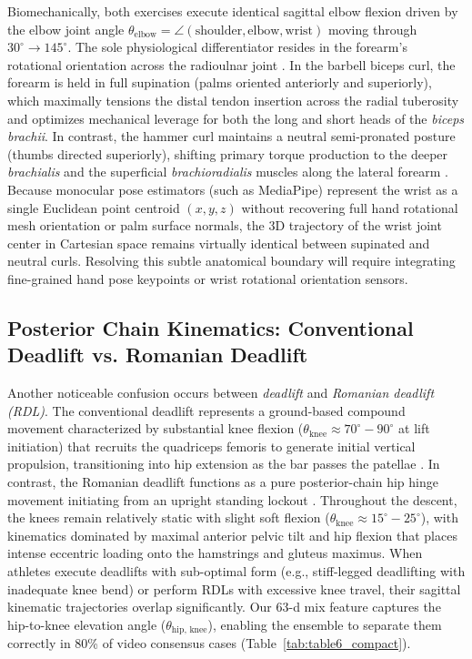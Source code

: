 \documentclass[runningheads]{llncs}
\begin{document}
Biomechanically, both exercises execute identical sagittal elbow flexion driven by the elbow joint angle $\theta_{\text{elbow}} = \angle(\text{shoulder}, \text{elbow}, \text{wrist})$ moving through $30^\circ \to 145^\circ$. The sole physiological differentiator resides in the forearm's rotational orientation across the radioulnar joint \cite{oliveira2009,marcolin2018}. In the barbell biceps curl, the forearm is held in full supination (palms oriented anteriorly and superiorly), which maximally tensions the distal tendon insertion across the radial tuberosity and optimizes mechanical leverage for both the long and short heads of the \textit{biceps brachii}. In contrast, the hammer curl maintains a neutral semi-pronated posture (thumbs directed superiorly), shifting primary torque production to the deeper \textit{brachialis} and the superficial \textit{brachioradialis} muscles along the lateral forearm \cite{oliveira2009,marcolin2018}. Because monocular pose estimators (such as MediaPipe) represent the wrist as a single Euclidean point centroid $(x, y, z)$ without recovering full hand rotational mesh orientation or palm surface normals, the 3D trajectory of the wrist joint center in Cartesian space remains virtually identical between supinated and neutral curls. Resolving this subtle anatomical boundary will require integrating fine-grained hand pose keypoints or wrist rotational orientation sensors.

\subsection{Posterior Chain Kinematics: Conventional Deadlift vs. Romanian Deadlift}
Another noticeable confusion occurs between \textit{deadlift} and \textit{Romanian deadlift (RDL)}. The conventional deadlift represents a ground-based compound movement characterized by substantial knee flexion ($\theta_{\text{knee}} \approx 70^\circ-90^\circ$ at lift initiation) that recruits the quadriceps femoris to generate initial vertical propulsion, transitioning into hip extension as the bar passes the patellae \cite{escamilla2000}. In contrast, the Romanian deadlift functions as a pure posterior-chain hip hinge movement initiating from an upright standing lockout \cite{mcallister2014,schoenfeld2010}. Throughout the descent, the knees remain relatively static with slight soft flexion ($\theta_{\text{knee}} \approx 15^\circ-25^\circ$), with kinematics dominated by maximal anterior pelvic tilt and hip flexion that places intense eccentric loading onto the hamstrings and gluteus maximus. When athletes execute deadlifts with sub-optimal form (e.g., stiff-legged deadlifting with inadequate knee bend) or perform RDLs with excessive knee travel, their sagittal kinematic trajectories overlap significantly. Our 63-d mix feature captures the hip-to-knee elevation angle ($\theta_{\text{hip, knee}}$), enabling the ensemble to separate them correctly in 80\% of video consensus cases (Table~\ref{tab:table6_compact}).
\end{document}
